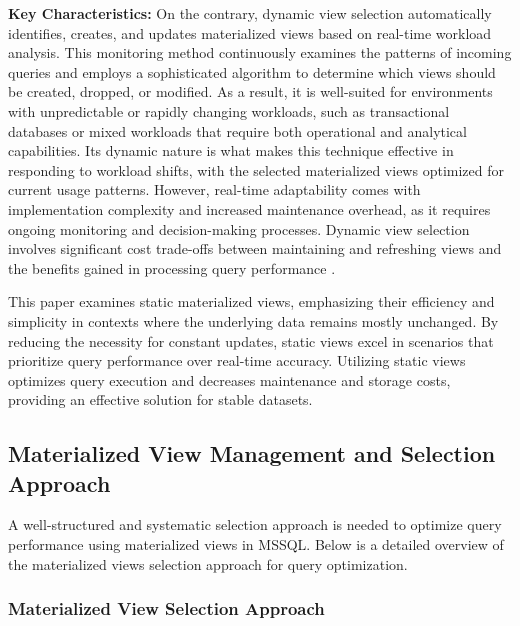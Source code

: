 \begin{enumerate}
    \textbf{Key Characteristics:} On the contrary, dynamic view selection automatically identifies, creates, and updates materialized views based on real-time workload analysis. This monitoring method continuously examines the patterns of incoming queries and employs a sophisticated algorithm to determine which views should be created, dropped, or modified. As a result, it is well-suited for environments with unpredictable or rapidly changing workloads, such as transactional databases or mixed workloads that require both operational and analytical capabilities. Its dynamic nature is what makes this technique effective in responding to workload shifts, with the selected materialized views optimized for current usage patterns. However, real-time adaptability comes with implementation complexity and increased maintenance overhead, as it requires ongoing monitoring and decision-making processes. Dynamic view selection involves significant cost trade-offs between maintaining and refreshing views and the benefits gained in processing query performance \cite{lohman2000selftuning,mamoulis2012survey,gupta2002selftuning}.
\end{enumerate}

This paper examines static materialized views, emphasizing their efficiency and simplicity in contexts where the underlying data remains mostly unchanged. By reducing the necessity for constant updates, static views excel in scenarios that prioritize query performance over real-time accuracy. Utilizing static views optimizes query execution and decreases maintenance and storage costs, providing an effective solution for stable datasets.

\subsection{ Materialized View Management and Selection Approach}

A well-structured and systematic selection approach is needed to optimize query performance using materialized views in MSSQL. Below is a detailed overview of the materialized views selection approach for query optimization.

\subsubsection{Materialized View Selection Approach}
  
